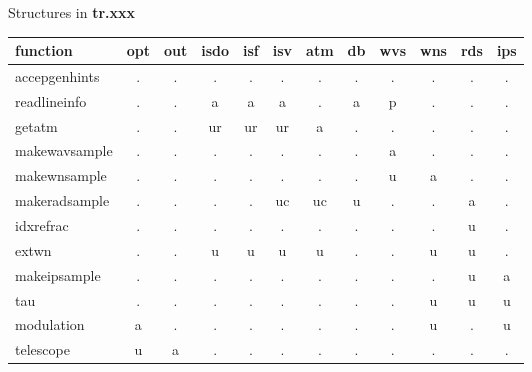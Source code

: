 \documentclass{article}
\begin{document}
\vspace{1cm}

\begin{center}
{\large Structures in {\bf tr.xxx}}\\[1cm]
\begin{tabular}{l|ccccccccccc}
function
   & opt & out & isdo & isf & isv & atm & db & wvs & wns & rds & ips \\
\hline	       					     	 		     
accepgenhints
   &  .  & .   & .    & .   & .   & .   & .  & .   & .   & .   & .   \\
readlineinfo
   &  .  & .   & a    & a   & a   & .   & a  & p   & .   & .   & .   \\
getatm
   &  .  & .   & ur   & ur  & ur  & a   & .  & .   & .   & .   & .   \\
makewavsample
   &  .  & .   & .    & .   & .   & .   & .  & a   & .   & .   & .   \\
makewnsample
   &  .  & .   & .    & .   & .   & .   & .  & u   & a   & .   & .   \\
makeradsample
   &  .  & .   & .    & .   & uc  & uc  & u  & .   & .   & a   & .   \\
idxrefrac
   &  .  & .   & .    & .   & .   & .   & .  & .   & .   & u   & .   \\
extwn
   &  .  & .   & u    & u   & u   & u   & .  & .   & u   & u   & .   \\
makeipsample
   &  .  & .   & .    & .   & .   & .   & .  & .   & .   & u   & a   \\
tau
   &  .  & .   & .    & .   & .   & .   & .  & .   & u   & u   & u   \\
modulation
   &  a  & .   & .    & .   & .   & .   & .  & .   & u   & .   & u   \\
telescope
   &  u  & a   & .    & .   & .   & .   & .  & .   & .   & .   & .   \\
\hline
\end{tabular}
\end{center}
\end{document}
